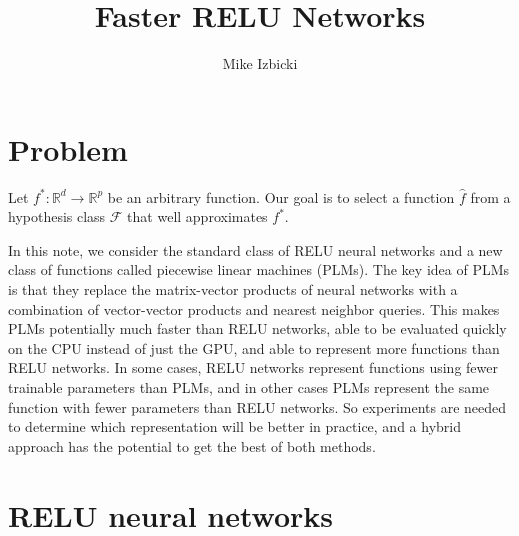 \documentclass{article}
\title{Faster RELU Networks}
\author{Mike Izbicki}
\DeclareMathOperator*{\argmin}{arg\,min}
\DeclareMathOperator*{\E}{\mathbb{E}}
\newcommand{\R}{\mathbb{R}}
\newcommand{\F}{\mathcal{F}}
\newcommand{\D}{\mathcal{D}}
\newcommand{\x}{\mathbf{x}}
\newcommand{\f}{f}
\newcommand{\fstar}{\f^*}
\newcommand{\fhat}{{\hat\f}}
\newcommand{\loss}{\ell}
\begin{document}
\maketitle

\section{Problem} 

Let $\fstar : \R^{d} \to \R^{p}$ be an arbitrary function.
Our goal is to select a function $\fhat$ from a hypothesis class $\F$ that well approximates $\fstar$.

In this note, we consider the standard class of RELU neural networks and a new class of functions called piecewise linear machines (PLMs).
The key idea of PLMs is that they replace the matrix-vector products of neural networks with a combination of vector-vector products and nearest neighbor queries.
This makes PLMs potentially much faster than RELU networks,
able to be evaluated quickly on the CPU instead of just the GPU,
and able to represent more functions than RELU networks.
In some cases, RELU networks represent functions using fewer trainable parameters than PLMs,
and in other cases PLMs represent the same function with fewer parameters than RELU networks.
So experiments are needed to determine which representation will be better in practice,
and a hybrid approach has the potential to get the best of both methods.

\section{RELU neural networks}
\end{document}
